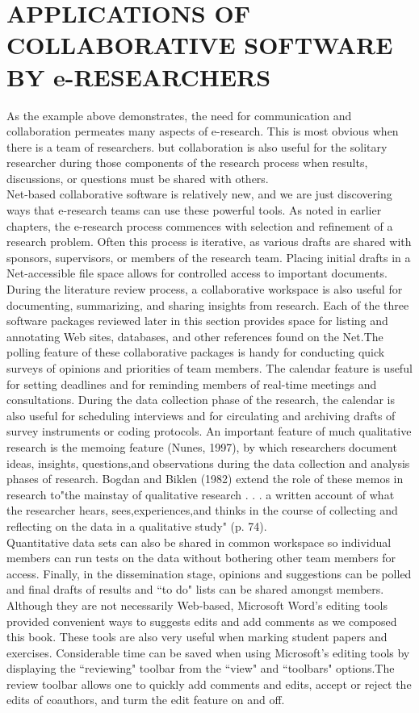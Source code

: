 \documentclass[a4paper,12pt]{article}
\begin{document}
	\section{APPLICATIONS OF COLLABORATIVE SOFTWARE BY e-RESEARCHERS}
	As the example above demonstrates, the need for communication and collaboration
	permeates many aspects of e-research. This is most obvious when there is a team of
	researchers. but collaboration is also useful for the solitary researcher during those components of the research process when results, discussions, or questions must be shared with others.\\
	Net-based collaborative software is relatively new, and we are just discovering ways that e-research teams can use these powerful tools. As noted in earlier chapters, the e-research process commences with selection and refinement of a research problem. 	Often this process is iterative, as various drafts are shared with sponsors, supervisors, or members of the research team. Placing initial drafts in a Net-accessible file space allows for controlled access to important documents. During the literature review process, a collaborative workspace is also useful for documenting, summarizing, and sharing insights from research. Each of the three software packages reviewed later in this section provides space for listing and annotating Web sites, databases, and other references found on the Net.The polling feature of these collaborative packages is handy for conducting quick surveys of opinions and priorities of team members. The calendar feature is useful for setting deadlines and for reminding members of real-time meetings and consultations. During the data collection phase of the research, the calendar is also useful for scheduling interviews and for circulating and archiving drafts of survey instruments or coding protocols. An important feature of much qualitative research is the memoing feature (Nunes, 1997), by which researchers document ideas, insights, questions,and observations during the data collection and analysis phases of research. Bogdan and Biklen (1982) extend the role of these memos in research to"the mainstay of qualitative research . . . a written account of what the researcher hears, sees,experiences,and thinks in the course of collecting and reflecting on the data in a qualitative study" (p. 74).\\
		Quantitative data sets can also be shared in common workspace so individual
	members can run tests on the data without bothering other team members for access.
	Finally, in the dissemination stage, opinions and suggestions can be polled and final drafts of results and “to do" lists can be shared amongst members. Although they are not necessarily Web-based, Microsoft Word's editing tools provided convenient ways to suggests edits and add comments as we composed this book. These tools are also very useful when marking student papers and exercises. Considerable time can be saved when using Microsoft's editing tools by displaying the “reviewing" toolbar from the “view" and “toolbars" options.The review toolbar allows one to quickly add comments and edits, accept or reject the edits of coauthors, and turm the edit feature on and off.\\
\end{document}
